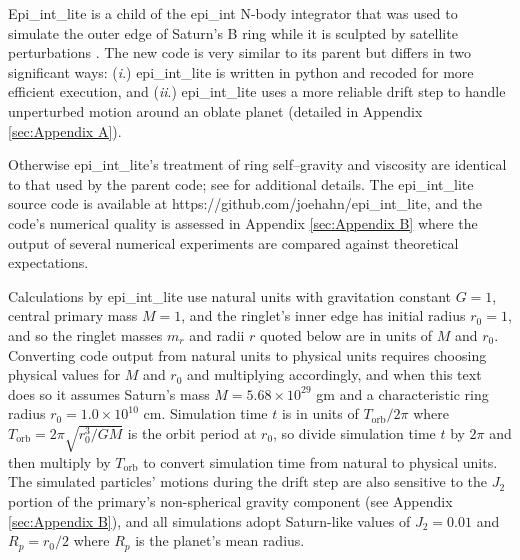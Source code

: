 \documentclass[preprint]{aastex62}
\begin{document}
Epi\_int\_lite is a child of the epi\_int N-body integrator that was used to
simulate the outer edge of Saturn's B ring while it is sculpted by satellite perturbations
\citep{HS13}. The new code is very similar to its parent but differs in two significant ways:
({\it i}.) epi\_int\_lite is written in python and recoded for more efficient execution, and
({\it ii}.) epi\_int\_lite uses a more reliable drift step to handle
unperturbed motion around an oblate planet (detailed in Appendix \ref{sec:Appendix A}).

Otherwise epi\_int\_lite's treatment of ring self--gravity and viscosity are identical
to that used by the parent code; see \cite{HS13} for additional details. The epi\_int\_lite 
source code is available at https://github.com/joehahn/epi\_int\_lite, and the
code's numerical quality is assessed in Appendix \ref{sec:Appendix B}
where the output of several numerical experiments are compared against theoretical expectations.

Calculations by epi\_int\_lite use natural units with gravitation constant $G=1$, 
central primary mass $M=1$, and the ringlet's inner edge has initial radius
$r_0=1$, and so the ringlet masses $m_r$ and radii $r$ quoted below are in units of $M$ and $r_0$.
Converting code output from natural units to physical units requires choosing	
physical values for $M$ and $r_0$ and multiplying accordingly, and when this text does so
it assumes Saturn's mass $M=5.68\times10^{29}$ gm and a characteristic
ring radius $r_0=1.0\times10^{10}$ cm. Simulation time $t$ is in units of $T_{\text{orb}}/2\pi$
where $T_{\text{orb}} = 2\pi\sqrt{r_0^3/GM}$ is the orbit period at $r_0$, 
so divide simulation time $t$ by $2\pi$ and then multiply
by $T_{\text{orb}}$ to convert simulation time from natural to physical units.
The simulated particles' motions during the drift step are also
sensitive to the $J_2$ portion of the primary's non-spherical gravity component 
(see Appendix \ref{sec:Appendix B}), and all simulations
adopt Saturn-like values of $J_2=0.01$ and $R_p=r_0/2$ where $R_p$ is the planet's
mean radius.
\end{document}
